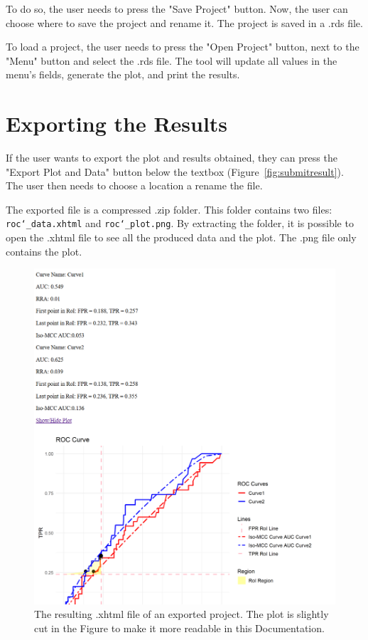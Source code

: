 \documentclass{article}
\begin{document}
	 To do so, the user needs to press the "Save Project" button. Now, the user can choose where to save the project and rename it. The project is saved in a .rds file.
	 
	 To load a project, the user needs to press the "Open Project" button, next to the "Menu" button and select the .rds file. The tool will update all values in the menu's fields, generate the plot, and print the results.
	 
	 \section{Exporting the Results}
	 If the user wants to export the plot and results obtained, they can press the "Export Plot and Data" button below the textbox (Figure~\ref{fig:submitresult}). The user then needs to choose a location a rename the file.
	 
	 The exported file is a compressed .zip folder. This folder contains two files: \texttt{roc\char`_data.xhtml} and \texttt{roc\char`_plot.png}. By extracting the folder, it is possible to open the .xhtml file to see all the produced data and the plot. The .png file only contains the plot.
	 
	 \begin{figure}[h!]
	 	\centering
	 	\caption{The resulting .xhtml file of an exported project. The plot is slightly cut in the Figure to make it more readable in this Documentation.}
	 	\label{fig:exportResult}
	 	\includegraphics[width=1\linewidth]{Figures/export_result.png}
	 \end{figure}
	 
	  
	 
	 
\end{document}
